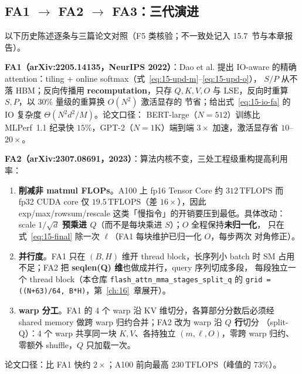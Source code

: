 \subsection{FA1 $\to$ FA2 $\to$ FA3：三代演进}

以下历史陈述逐条与三篇论文对照（F5 类核验；不一致处记入 15.7~节与本章报告）。

\textbf{FA1（arXiv:2205.14135，NeurIPS 2022）}：Dao et al. 提出 IO-aware 的精确
attention：tiling + online softmax（式~\ref{eq:15-upd-m}--\ref{eq:15-upd-o}），
$S/P$ 从不落 HBM；反向传播用 \textbf{recomputation}，只存 $Q,K,V,O$ 与
$\mathrm{LSE}$，反向时重算 $S, P$，以 $30\%$ 量级的重算换 $O(N^{2})$ 激活显存的
节省；给出式~\ref{eq:15-io-fa} 的 IO 复杂度 $\Theta(N^{2}d^{2}/M)$。论文口径：
BERT-large（$N{=}512$）训练比 MLPerf~1.1 纪录快 $15\%$，GPT-2（$N{=}1$K）端到端
$3\times$ 加速，激活显存省 $10$--$20\times$。

\textbf{FA2（arXiv:2307.08691，2023）}：算法内核不变，三处工程级重构提高利用率：
\begin{enumerate}[itemsep=0pt,topsep=2pt]
  \item \textbf{削减非 matmul FLOPs}。A100 上 fp16 Tensor Core 约 $312\,\mathrm{TFLOPS}$
        而 fp32 CUDA core 仅 $19.5\,\mathrm{TFLOPS}$（差 $16\times$），因此
        exp/max/rowsum/rescale 这类「慢指令」的开销要压到最低。具体改动：scale $1/\sqrt{d}$
        \textbf{预乘进 $Q$}（而不是每块乘进 $S$）；$O$ 全程保持\textbf{未归一化}，
        只在式~\ref{eq:15-final} 除一次 $\ell$（FA1 每块维护已归一化 $O$，每步两次
        对角修正）。
  \item \textbf{并行度}。FA1 只在 $(B, H)$ 维开 thread block，长序列小 batch 时
        SM 占用不足；FA2 把 \textbf{seqlen(Q) 维}也做成并行，query 序列切成多段，
        每段独立一个 thread block（本仓库 \texttt{flash\_\allowbreak{}attn\_\allowbreak{}mma\_\allowbreak{}stages\_\allowbreak{}split\_\allowbreak{}q}
        的 \texttt{grid = ((N+63)/64, B*H)}，第~\ref{ch:16}~章展开）。
  \item \textbf{warp 分工}。FA1 的 4 个 warp 沿 KV 维切分，各算部分分数后必须经
        shared memory 做跨 warp 归约合并；FA2 改为 warp 沿 \textbf{$Q$ 行}切分
        （split-Q）：4 个 warp 共享同一块 $K, V$、各持独立 $(m, \ell, O)$，零跨
        warp 归约、零额外 shuffle，$Q$ 只加载一次。
\end{enumerate}
论文口径：比 FA1 快约 $2\times$；A100 前向最高 $230\,\mathrm{TFLOPS}$（峰值的
$73\%$）。

